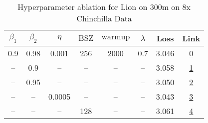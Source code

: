 \begin{table}[H]
\centering
\caption{Hyperparameter ablation for Lion on 300m on 8x Chinchilla Data}
\label{tab:ablation_lion_300m_8}
\begin{tabular}{cccccccc}
\toprule
$\beta_1$ & $\beta_2$ & $\eta$ & $\mathrm{BSZ}$ & $\mathrm{warmup}$ & $\lambda$ & Loss & Link \\
\midrule
0.9 & 0.98 & 0.001 & 256 & 2000 & 0.7 & 3.046 & \href{https://wandb.ai/stanford-mercury/optimizer-scaling/runs/sweep-300m-48B-lioneb1a25lr0.001-wd0.7-minlr0-warmup2000-b10.9-b-2006af}{0} \\
\midrule
-- & 0.9 & -- & -- & -- & -- & 3.058 & \href{https://wandb.ai/stanford-mercury/optimizer-scaling/runs/sweep-300m-48B-lion2962dblr0.001-wd0.7-minlr0-warmup2000-b10.9-b-5ec1df}{1} \\
-- & 0.95 & -- & -- & -- & -- & 3.050 & \href{https://wandb.ai/stanford-mercury/optimizer-scaling/runs/sweep-300m-48B-lion2842d8lr0.001-wd0.7-minlr0-warmup2000-b10.9-b-df0b7e}{2} \\
-- & -- & 0.0005 & -- & -- & -- & 3.043 & \href{https://wandb.ai/stanford-mercury/optimizer-scaling/runs/sweep-300m-48B-lion698f3blr0.0005-wd0.7-minlr0-warmup2000-b10.9--6f8954}{3} \\
-- & -- & -- & 128 & -- & -- & 3.061 & \href{https://wandb.ai/stanford-mercury/optimizer-scaling/runs/sweep-300m-48B-lion875c0alr0.001-wd0.7-minlr0-warmup2000-b10.9-b-a1a7a1}{4} \\
\bottomrule
\end{tabular}
\end{table}

